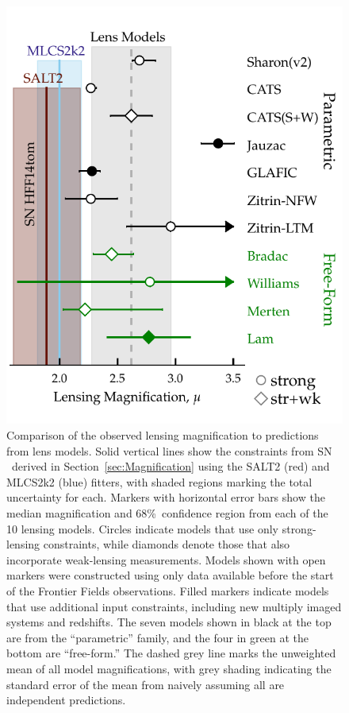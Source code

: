 

\begin{figure}
\begin{center}
\includegraphics[width=\columnwidth]{FIG/snTomas_magnifications}
\caption{ 
Comparison of the observed lensing magnification to predictions from
lens models. Solid vertical lines show the constraints from SN \tomas\
derived in Section~\ref{sec:Magnification} using the SALT2 (red) and
MLCS2k2 (blue) fitters, with shaded regions marking the total
uncertainty for each. Markers with horizontal error bars show the
median magnification and 68\%\ confidence region from each of the 10
lensing models.  Circles indicate models that use only strong-lensing
constraints, while diamonds denote those that also incorporate
weak-lensing measurements.  Models shown with open markers were
constructed using only data available before the start of the Frontier
Fields observations.  Filled markers indicate models that use
additional input constraints, including new multiply imaged systems
and redshifts.  The seven models shown in black at the top are from
the ``parametric'' family, and the four in green at the bottom are
``free-form.''  The dashed grey line marks the unweighted mean of all
model magnifications, with grey shading indicating the standard error
of the mean from naively assuming all are independent predictions.
\label{fig:lensingtest} }
\end{center}
\end{figure}

